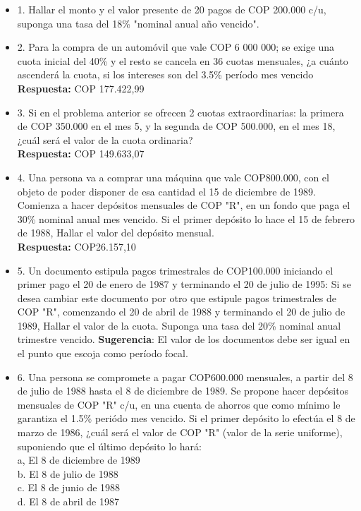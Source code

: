 \begin{itemize}

 \item 1. Hallar el monto y el valor presente de 20 pagos de COP 200.000 c/u, suponga una tasa del 18\% "nominal anual año vencido".\\
       \medskip

 \item 2. Para la compra de un automóvil que vale COP 6 000 000; se exige una cuota inicial del 40\% y el resto se cancela en 36 cuotas mensuales, ¿a cuánto ascenderá la cuota, si los intereses son del 3.5\% período mes vencido\\
       \textbf{Respuesta:} COP 177.422,99\\
       \medskip

 \item 3. Si en el problema anterior se ofrecen 2 cuotas extraordinarias: la primera de
       COP 350.000 en el mes 5, y la segunda de COP 500.000, en el mes 18, ¿cuál será el valor de la cuota ordinaria?\\
       \textbf{Respuesta:} COP 149.633,07\\
       \medskip

 \item 4. Una persona va a comprar una máquina que vale COP800.000, con el objeto de poder disponer de esa cantidad el 15 de diciembre de 1989. Comienza a hacer depósitos mensuales de  COP  "R", en un fondo que paga el 30\% nominal anual mes vencido. Si el primer depósito lo hace el 15 de febrero de 1988, Hallar el valor del depósito mensual.\\
       \textbf{Respuesta:} COP26.157,10\\
       \medskip

 \item 5. Un documento estipula pagos trimestrales de COP100.000 iniciando el primer pago el 20 de enero de 1987 y terminando el 20 de julio de 1995: Si se desea cambiar este documento por otro que estipule pagos trimestrales de  COP  "R", comenzando el 20 de abril de 1988 y terminando el 20 de julio de 1989, Hallar el valor de la cuota. Suponga una tasa del 20\% nominal anual trimestre vencido. \textbf{Sugerencia}: El valor de los documentos debe ser igual en el punto que escoja como período focal.\\
       \medskip

 \item 6. Una persona se compromete a pagar COP600.000 mensuales, a partir del 8 de julio de 1988 hasta el 8 de diciembre de 1989. Se propone hacer depósitos mensuales de  COP  "R" c/u, en una cuenta de ahorros que como mínimo le garantiza el 1.5\% periódo mes vencido. Si el primer depósito lo efectúa el 8 de marzo de 1986, ¿cuál será el valor de  COP  "R" (valor de la serie uniforme), suponiendo que el último depósito lo hará:\\
       a, El 8 de diciembre de 1989\\
       b. El 8 de julio de 1988\\
       c. El 8 de junio de 1988\\
       d. El 8 de abril de 1987\\
       \medskip


\end{itemize}
